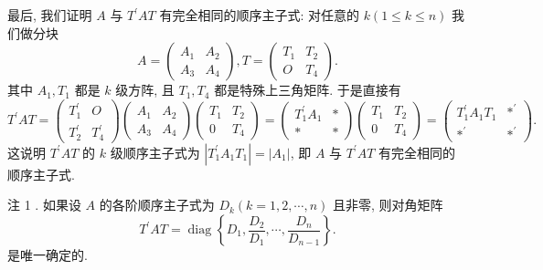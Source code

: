 \documentclass{article}
\begin{document}
最后, 我们证明 $A$ 与 $T^{\prime} A T$ 有完全相同的顺序主子式: 对任意的 $k(1 \leq k \leq n)$ 我们做分块
\begin{equation*}
    A=\left(\begin{array}{ll}
        A_{1} & A_{2} \\
        A_{3} & A_{4}
    \end{array}\right), T=\left(\begin{array}{cc}
        T_{1} & T_{2} \\
        O     & T_{4}
    \end{array}\right).
\end{equation*}
其中 $A_{1}, T_{1}$ 都是 $k$ 级方阵, 且 $T_{1}, T_{4}$ 都是特殊上三角矩阵. 于是直接有
\begin{equation*}
    T^{\prime} A T=\left(\begin{array}{cc}
            T_{1}^{\prime} & O              \\
            T_{2}^{\prime} & T_{4}^{\prime}
        \end{array}\right)\left(\begin{array}{cc}
            A_{1} & A_{2} \\
            A_{3} & A_{4}
        \end{array}\right)\left(\begin{array}{cc}
            T_{1} & T_{2} \\
            0     & T_{4}
        \end{array}\right)=\left(\begin{array}{cc}
            T_{1}^{\prime} A_{1} & * \\
            *                    & *
        \end{array}\right)\left(\begin{array}{cc}
            T_{1} & T_{2} \\
            0     & T_{4}
        \end{array}\right)=\left(\begin{array}{cc}
            T_{1}^{\prime} A_{1} T_{1} & *^{\prime} \\
            *^{\prime}                 & *^{\prime}
        \end{array}\right).
\end{equation*}
这说明 $T^{\prime} A T$ 的 $k$ 级顺序主子式为 $\left|T_{1}^{\prime} A_{1} T_{1}\right|=\left|A_{1}\right|$, 即 $A$ 与 $T^{\prime} A T$ 有完全相同的顺序主子式.

{\heiti 注 1 .} 如果设 $A$ 的各阶顺序主子式为 $D_{k}(k=1,2, \cdots, n)$ 且非零, 则对角矩阵
\begin{equation*}
    T^{\prime} A T=\operatorname{diag}\left\{D_{1}, \frac{D_{2}}{D_{1}}, \cdots, \frac{D_{n}}{D_{n-1}}\right\}.
\end{equation*}
是唯一确定的.
\end{document}
